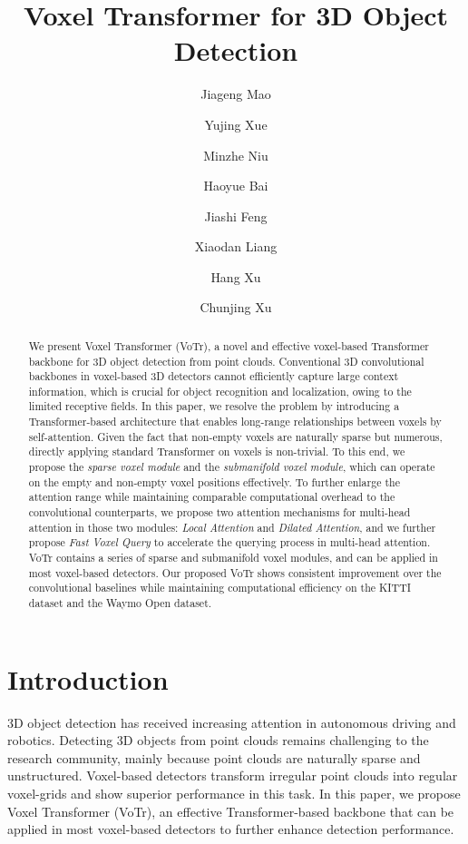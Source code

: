 \documentclass[10pt,twocolumn,letterpaper]{article}
\begin{document}
\title{Voxel Transformer for 3D Object Detection}

\author{Jiageng Mao 
\and
Yujing Xue 
\and
Minzhe Niu 
\and
Haoyue Bai 
\and
Jiashi Feng 
\and
Xiaodan Liang 
\and
Hang Xu 
\and
Chunjing Xu 
}

\maketitle
\ificcvfinal\thispagestyle{empty}\fi

\begin{abstract}
We present Voxel Transformer (VoTr), a novel and effective voxel-based Transformer backbone for 3D object detection from point clouds. Conventional 3D convolutional backbones in voxel-based 3D detectors cannot efficiently capture large context information, which is crucial for object recognition and localization, owing to the limited receptive fields. In this paper, we resolve the problem by introducing a Transformer-based architecture that enables long-range relationships between voxels by self-attention. Given the fact that non-empty voxels are naturally sparse but numerous, directly applying standard Transformer on voxels is non-trivial. To this end, we propose the \textit{sparse voxel module} and the \textit{submanifold voxel module}, which can operate on the empty and non-empty voxel positions effectively. To further enlarge the attention range while maintaining comparable computational overhead to the convolutional counterparts, we propose two attention mechanisms for multi-head attention in those two modules: \textit{Local Attention} and \textit{Dilated Attention}, and we further propose \textit{Fast Voxel Query} to accelerate the querying process in multi-head attention. VoTr contains a series of sparse and submanifold voxel modules, and can be applied in most voxel-based detectors. Our proposed VoTr shows consistent improvement over the convolutional baselines while maintaining computational efficiency on the KITTI dataset and the Waymo Open dataset.
\end{abstract}

\let\thefootnote\relax{}

\section{Introduction}
3D object detection has received increasing attention in autonomous driving and robotics. Detecting 3D objects from point clouds remains challenging to the research community, mainly because point clouds are naturally sparse and unstructured. Voxel-based detectors transform irregular point clouds into regular voxel-grids and show superior performance in this task. In this paper, we propose Voxel Transformer (VoTr), an effective Transformer-based backbone that can be applied in most voxel-based detectors to further enhance detection performance. 
\end{document}
